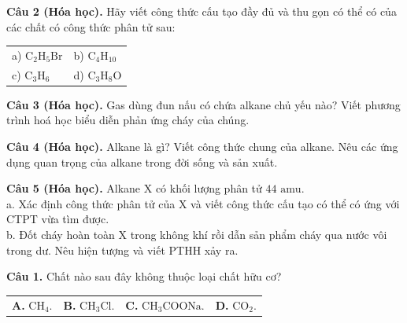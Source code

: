 \documentclass{article}
\begin{document}
\fontsize{25}{33}\selectfont
\textbf{Câu 2 (Hóa học).} Hãy viết công thức cấu tạo đầy đủ và thu gọn có thể có của các chất có công thức phân tử sau:
\vspace{16pt}

\begin{tabularx}{\linewidth}{@{}X X@{}}
a) $\text{C}_2\text{H}_5\text{Br}$ & b) $\text{C}_4\text{H}_{10}$\\[16pt]
c) $\text{C}_3\text{H}_6$ & d) $\text{C}_3\text{H}_8\text{O}$
\end{tabularx}
\vspace*{\fill}
\newpage

\fontsize{26}{34}\selectfont
\textbf{Câu 3 (Hóa học).} Gas dùng đun nấu có chứa alkane chủ yếu nào? Viết phương trình hoá học biểu diễn phản ứng cháy của chúng.
\vspace*{\fill}
\newpage

\fontsize{26}{34}\selectfont
\textbf{Câu 4 (Hóa học).} Alkane là gì? Viết công thức chung của alkane. Nêu các ứng dụng quan trọng của alkane trong đời sống và sản xuất.
\vspace*{\fill}
\newpage

\fontsize{25}{33}\selectfont
\textbf{Câu 5 (Hóa học).} Alkane X có khối lượng phân tử $44\text{ amu}$.\\
a. Xác định công thức phân tử của X và viết công thức cấu tạo có thể có ứng với CTPT vừa tìm được.\\
b. Đốt cháy hoàn toàn X trong không khí rồi dẫn sản phẩm cháy qua nước vôi trong dư. Nêu hiện tượng và viết PTHH xảy ra.
\vspace*{\fill}
\newpage


\fontsize{24}{31}\selectfont
\textbf{Câu 1.} Chất nào sau đây không thuộc loại chất hữu cơ?
\vspace{4pt}

\begin{tabularx}{\linewidth}{@{}X X X X@{}}
\textbf{A.} $\text{CH}_4$. & \textbf{B.} $\text{CH}_3\text{Cl}$. & \textbf{C.} $\text{CH}_3\text{COONa}$. & \textbf{D.} $\text{CO}_2$.
\end{tabularx}
\end{document}
